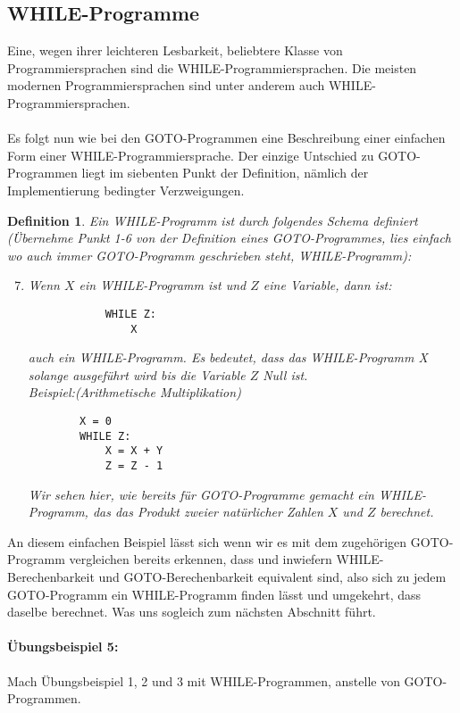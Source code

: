 \documentclass[11pt,a4paper,leqno]{report}
\newtheorem{definition}[theorem]{Definition}
\numberwithin{equation}{chapter}
\begin{document}
\subsection{WHILE-Programme}
Eine, wegen ihrer leichteren Lesbarkeit, beliebtere Klasse von Programmiersprachen sind die WHILE-Programmiersprachen. Die meisten modernen Programmiersprachen sind unter anderem auch WHILE-Programmiersprachen.\\
\\
Es folgt nun wie bei den GOTO-Programmen eine Beschreibung einer einfachen Form einer WHILE-Programmiersprache. Der einzige Untschied zu GOTO-Programmen liegt im siebenten Punkt der Definition, nämlich der Implementierung bedingter Verzweigungen.
\begin{definition}
	Ein WHILE-Programm ist durch folgendes Schema definiert (Übernehme Punkt 1-6 von der Definition eines GOTO-Programmes, lies einfach wo auch immer GOTO-Programm geschrieben steht, WHILE-Programm):
	\begin{enumerate}
 		\setcounter{enumi}{6}
		\item Wenn $X$ ein WHILE-Programm ist und $Z$ eine Variable, dann ist: 
		\begin{lstlisting}
			WHILE Z:
			    X
		\end{lstlisting}
		auch ein WHILE-Programm. Es bedeutet, dass das WHILE-Programm X solange ausgeführt wird bis die Variable $Z$ Null ist.\\
		Beispiel:(Arithmetische Multiplikation)
		\begin{lstlisting}
		X = 0
		WHILE Z:
		    X = X + Y
		    Z = Z - 1
		\end{lstlisting}	
		Wir sehen hier, wie bereits für GOTO-Programme gemacht ein WHILE-Programm, das das Produkt zweier natürlicher Zahlen $X$ und $Z$ berechnet. 
	\end{enumerate}
\end{definition}
An diesem einfachen Beispiel lässt sich wenn wir es mit dem zugehörigen GOTO-Programm vergleichen bereits erkennen, dass und inwiefern WHILE-Berechenbarkeit und GOTO-Berechenbarkeit equivalent sind, also sich zu jedem GOTO-Programm ein WHILE-Programm finden lässt und umgekehrt, dass daselbe berechnet. Was uns sogleich zum nächsten Abschnitt führt.
\paragraph{Übungsbeispiel 5:} Mach Übungsbeispiel 1, 2 und 3 mit WHILE-Programmen, anstelle von GOTO-Programmen.
\end{document}
